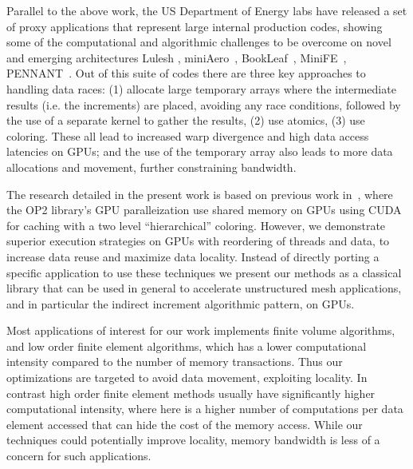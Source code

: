 Parallel to the above work, the US Department of Energy labs have released a 
set of proxy applications that represent large internal production codes,
showing some of the computational and algorithmic challenges to be overcome on 
novel and emerging architectures Lulesh \cite{LULESH2:changes}, 
miniAero~\cite{miniaero}, BookLeaf~\cite{bookleaf}, MiniFE~\cite{minife}, 
PENNANT~\cite{pennant}. Out of this suite of codes there are three key 
approaches to handling data races: (1) allocate large temporary arrays where 
the intermediate results (i.e. the increments) are placed, avoiding any race 
conditions, followed by the use of a separate kernel to gather the results, 
(2) use atomics, (3) use coloring. These all lead to increased warp divergence 
and high data access latencies on GPUs; and the use of the temporary array also 
leads to more data allocations and movement, further constraining bandwidth. 

The research detailed in the present work is based on previous work 
in~\cite{op2}, where the OP2 library's GPU paralleization use shared memory on 
GPUs using CUDA for caching with a two level ``hierarchical'' coloring. However, 
we demonstrate superior execution strategies on GPUs with reordering of threads 
and data, to increase data reuse and maximize data locality. Instead of directly 
porting a specific application to use these techniques we present our methods 
as a classical library that can be used in general to accelerate unstructured 
mesh applications, and in particular the indirect increment algorithmic 
pattern, on GPUs.

Most applications of interest for our work implements finite volume algorithms, 
and low order finite element algorithms, which has a lower computational 
intensity compared to the number of memory transactions. Thus our optimizations 
are targeted to avoid data movement, exploiting locality. In contrast high 
order finite element methods usually have significantly higher computational 
intensity, where here is a higher number of computations per data element 
accessed that can hide the cost of the memory access. While our techniques could 
potentially improve locality, memory bandwidth is less of a concern for such 
applications.


